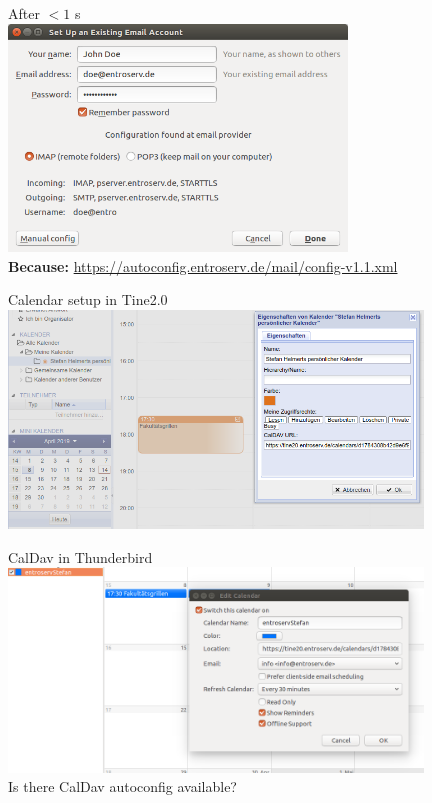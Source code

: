 \documentclass{beamer}
\begin{document}
\begin{frame}[fragile]{\insertsection}{\insertsubsection}
	\vspace{-0.5cm}
	After $<1$ s\\
	\includegraphics[width=9cm]{autoconfigTB2.png}\\
	\textbf{Because:} \url{https://autoconfig.entroserv.de/mail/config-v1.1.xml}
\end{frame}	

\begin{frame}[fragile]{\insertsection}{\insertsubsection}
	\vspace{-0.5cm}
	Calendar setup in Tine2.0
	\includegraphics[width=11cm]{tine20Calendar.png}\\
\end{frame}	

\begin{frame}[fragile]{\insertsection}{\insertsubsection}
	\vspace{-0.5cm}
	CalDav in Thunderbird
	\includegraphics[width=11cm]{CalDavTB.png}\\
	Is there CalDav autoconfig available?
\end{frame}	
\end{document}
